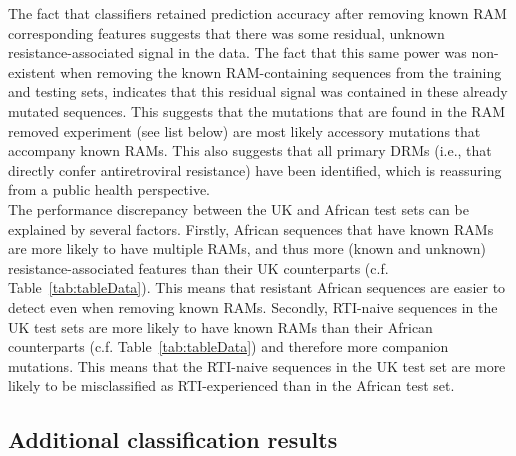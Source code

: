 \documentclass[
  11,
]{scrbook}
\begin{document}
The fact that classifiers retained prediction accuracy after removing
known RAM corresponding features suggests that there was some residual,
unknown resistance-associated signal in the data. The fact that this
same power was non-existent when removing the known RAM-containing
sequences from the training and testing sets, indicates that this
residual signal was contained in these already mutated sequences. This
suggests that the mutations that are found in the RAM removed experiment
(see list below) are most likely accessory mutations that accompany
known RAMs. This also suggests that all primary DRMs (i.e., that
directly confer antiretroviral resistance) have been identified, which
is reassuring from a public health perspective.\\
The performance discrepancy between the UK and African test sets can be
explained by several factors. Firstly, African sequences that have known
RAMs are more likely to have multiple RAMs, and thus more (known and
unknown) resistance-associated features than their UK counterparts (c.f.
Table~\ref{tab:tableData}). This
means that resistant African sequences are easier to detect even when
removing known RAMs. Secondly, RTI-naive sequences in the UK test sets
are more likely to have known RAMs than their African counterparts (c.f.
Table~\ref{tab:tableData}) and
therefore more companion mutations. This means that the RTI-naive
sequences in the UK test set are more likely to be misclassified as
RTI-experienced than in the African test set.

\hypertarget{additional-classification-results}{%
\subsection{Additional classification results}\label{additional-classification-results}}
\end{document}
